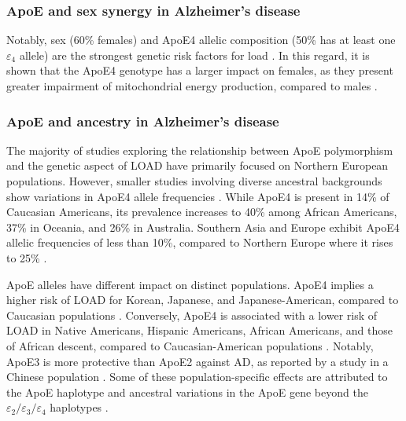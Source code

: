 \documentclass{amsart}
\begin{document}
\subsubsection{ApoE and sex synergy in Alzheimer's disease}
Notably, sex (60\% females) and ApoE4 allelic composition (50\% has at least one $\varepsilon_4$ allele) are the strongest genetic risk factors for \acrshort{load} \cite{Arnold2020SexMetabolome}. In this regard, it is shown that the ApoE4 genotype has a larger impact on females, as they present greater impairment of mitochondrial energy production, compared to males \cite{Arnold2020SexMetabolome, Yassine2020APOEDisease}.

\subsubsection{ApoE and ancestry in Alzheimer's disease} \label{ancestry}
The majority of studies exploring the relationship between ApoE polymorphism and the genetic aspect of LOAD have primarily focused on Northern European populations\cite{Yang2023ApolipoproteinDisease}. However, smaller studies involving diverse ancestral backgrounds show variations in ApoE4 allele frequencies \cite{Yang2023ApolipoproteinDisease}. While ApoE4 is present in 14\% of Caucasian Americans, its prevalence increases to 40\% among African Americans, 37\% in Oceania, and 26\% in Australia. Southern Asia and Europe exhibit ApoE4 allelic frequencies of less than 10\%, compared to Northern Europe where it rises to 25\% \cite{Belloy2019AForward, Egert2012ApoEFactors, Eisenberg2010WorldwideHistory, Logue2011AAmericans}.

ApoE alleles have different impact on distinct populations. ApoE4 implies a higher risk of LOAD for Korean, Japanese, and Japanese-American, compared to Caucasian populations \cite{Farrer1997EffectsMeta-analysis}. Conversely, ApoE4 is associated with a lower risk of LOAD in Native Americans, Hispanic Americans, African Americans, and those of African descent, compared to Caucasian-American populations \cite{Farrer1997EffectsMeta-analysis, Blue2019LocalHispanics, Suchy-Dicey2022APOEStudy, Rajabli2018AncestralPopulations, Naslavsky2022GlobalSample}. Notably, ApoE3 is more protective than ApoE2 against AD, as reported by a study in a Chinese population \cite{Chen2011ApolipoproteinDisease}. Some of these population-specific effects are attributed to the ApoE haplotype and ancestral variations in the ApoE gene beyond the $\varepsilon_2/\varepsilon_3/\varepsilon_4$ haplotypes \cite{Blue2019LocalHispanics, Rajabli2018AncestralPopulations}.
\end{document}
